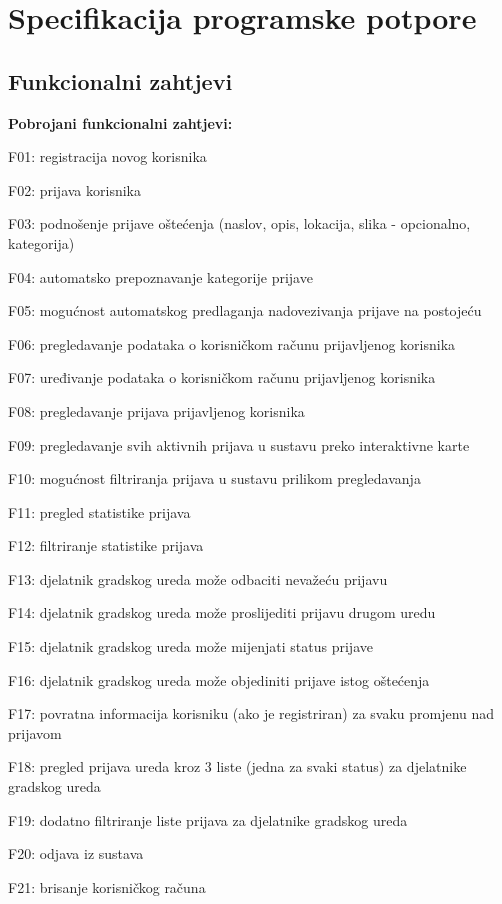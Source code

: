 \chapter{Specifikacija programske potpore}
		
	\section{Funkcionalni zahtjevi}
			
			\textbf{Pobrojani funkcionalni zahtjevi:}
			\begin{packed_item}
				\item F01: registracija novog korisnika
				\item F02: prijava korisnika
				\item F03: podnošenje prijave oštećenja (naslov, opis, lokacija, slika - opcionalno, kategorija)
				\item F04: automatsko prepoznavanje kategorije prijave
				\item F05: mogućnost automatskog predlaganja nadovezivanja prijave na postojeću
				\item F06: pregledavanje podataka o korisničkom računu prijavljenog korisnika
				\item F07: uređivanje podataka o korisničkom računu prijavljenog korisnika
				\item F08: pregledavanje prijava prijavljenog korisnika
				\item F09: pregledavanje svih aktivnih prijava u sustavu preko interaktivne karte
				\item F10: mogućnost filtriranja prijava u sustavu prilikom pregledavanja
				\item F11: pregled statistike prijava
				\item F12: filtriranje statistike prijava
				\item F13: djelatnik gradskog ureda može odbaciti nevažeću prijavu
				\item F14: djelatnik gradskog ureda može proslijediti prijavu drugom uredu
				\item F15: djelatnik gradskog ureda može mijenjati status prijave
				\item F16: djelatnik gradskog ureda može objediniti prijave istog oštećenja
				\item F17: povratna informacija korisniku (ako je registriran) za svaku promjenu nad prijavom
				\item F18: pregled prijava ureda kroz 3 liste (jedna za svaki status) za djelatnike gradskog ureda
				\item F19: dodatno filtriranje liste prijava za djelatnike gradskog ureda
				\item F20: odjava iz sustava
				\item F21: brisanje korisničkog računa
			\end{packed_item}
			\eject
			

